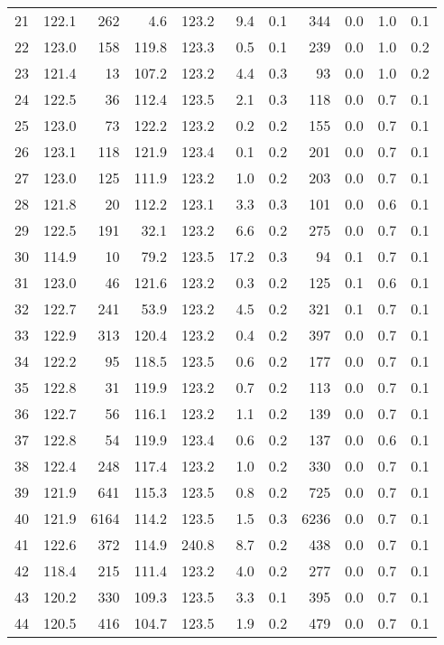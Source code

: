 \begin{tabular}{|r|rrrrr|rrrrr|}
21 & 122.1 & 262 & 4.6 & 123.2 & 9.4 & 0.1 & 344 & 0.0 & 1.0 & 0.1 \\
22 & 123.0 & 158 & 119.8 & 123.3 & 0.5 & 0.1 & 239 & 0.0 & 1.0 & 0.2 \\
23 & 121.4 & 13 & 107.2 & 123.2 & 4.4 & 0.3 & 93 & 0.0 & 1.0 & 0.2 \\
24 & 122.5 & 36 & 112.4 & 123.5 & 2.1 & 0.3 & 118 & 0.0 & 0.7 & 0.1 \\
25 & 123.0 & 73 & 122.2 & 123.2 & 0.2 & 0.2 & 155 & 0.0 & 0.7 & 0.1 \\
26 & 123.1 & 118 & 121.9 & 123.4 & 0.1 & 0.2 & 201 & 0.0 & 0.7 & 0.1 \\
27 & 123.0 & 125 & 111.9 & 123.2 & 1.0 & 0.2 & 203 & 0.0 & 0.7 & 0.1 \\
28 & 121.8 & 20 & 112.2 & 123.1 & 3.3 & 0.3 & 101 & 0.0 & 0.6 & 0.1 \\
29 & 122.5 & 191 & 32.1 & 123.2 & 6.6 & 0.2 & 275 & 0.0 & 0.7 & 0.1 \\
30 & 114.9 & 10 & 79.2 & 123.5 & 17.2 & 0.3 & 94 & 0.1 & 0.7 & 0.1 \\
31 & 123.0 & 46 & 121.6 & 123.2 & 0.3 & 0.2 & 125 & 0.1 & 0.6 & 0.1 \\
32 & 122.7 & 241 & 53.9 & 123.2 & 4.5 & 0.2 & 321 & 0.1 & 0.7 & 0.1 \\
33 & 122.9 & 313 & 120.4 & 123.2 & 0.4 & 0.2 & 397 & 0.0 & 0.7 & 0.1 \\
34 & 122.2 & 95 & 118.5 & 123.5 & 0.6 & 0.2 & 177 & 0.0 & 0.7 & 0.1 \\
35 & 122.8 & 31 & 119.9 & 123.2 & 0.7 & 0.2 & 113 & 0.0 & 0.7 & 0.1 \\
36 & 122.7 & 56 & 116.1 & 123.2 & 1.1 & 0.2 & 139 & 0.0 & 0.7 & 0.1 \\
37 & 122.8 & 54 & 119.9 & 123.4 & 0.6 & 0.2 & 137 & 0.0 & 0.6 & 0.1 \\
38 & 122.4 & 248 & 117.4 & 123.2 & 1.0 & 0.2 & 330 & 0.0 & 0.7 & 0.1 \\
39 & 121.9 & 641 & 115.3 & 123.5 & 0.8 & 0.2 & 725 & 0.0 & 0.7 & 0.1 \\
40 & 121.9 & 6164 & 114.2 & 123.5 & 1.5 & 0.3 & 6236 & 0.0 & 0.7 & 0.1 \\
41 & 122.6 & 372 & 114.9 & 240.8 & 8.7 & 0.2 & 438 & 0.0 & 0.7 & 0.1 \\
42 & 118.4 & 215 & 111.4 & 123.2 & 4.0 & 0.2 & 277 & 0.0 & 0.7 & 0.1 \\
43 & 120.2 & 330 & 109.3 & 123.5 & 3.3 & 0.1 & 395 & 0.0 & 0.7 & 0.1 \\
44 & 120.5 & 416 & 104.7 & 123.5 & 1.9 & 0.2 & 479 & 0.0 & 0.7 & 0.1 \\

\end{tabular}

